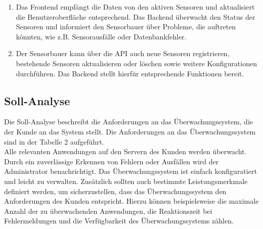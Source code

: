 \begin{flushleft}
\begin{enumerate}
	\item Das Frontend empfängt die Daten von den aktiven Sensoren und aktualisiert die Benutzeroberfläche entsprechend. Das Backend überwacht den Status der Sensoren und informiert den Sensorbauer über Probleme, die auftreten könnten, wie z.B. Sensorausfälle oder Datenbankfehler.
	\item Der Sensorbauer kann über die API auch neue Sensoren registrieren, bestehende Sensoren aktualisieren oder löschen sowie weitere Konfigurationen durchführen. Das Backend stellt hierfür entsprechende Funktionen bereit.
\end{enumerate}



\subsection{Soll-Analyse}
Die Soll-Analyse beschreibt die Anforderungen an das Überwachungssystem, die der Kunde an das System stellt.
Die Anforderungen an das Überwachungssystem sind in der Tabelle 2 aufgeführt.\\
Alle relevanten Anwendungen auf den Servern des Kunden
werden überwacht. Durch ein zuverlässige Erkennen von Fehlern oder Ausfällen
wird der Administrator benachrichtigt. Das Überwachungssystem ist einfach konfiguratiert und leicht zu verwalten.
Zusätzlich sollten auch bestimmte Leistungsmerkmale definiert werden, um sicherzustellen, dass das Überwachungssystem den Anforderungen des Kunden entspricht.
Hierzu können beispielsweise die maximale Anzahl der zu überwachenden Anwendungen, die Reaktionszeit bei Fehlermeldungen und die Verfügbarkeit des Überwachungssystems zählen.


\end{flushleft}
